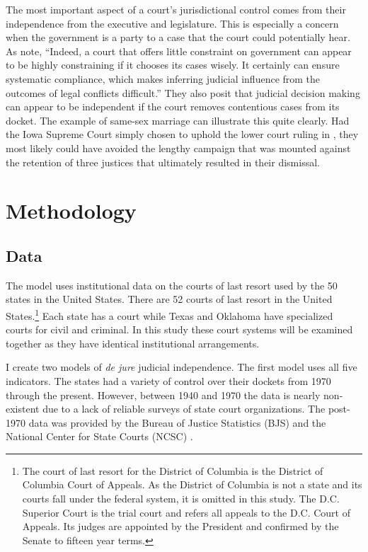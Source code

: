 \documentclass[12pt]{article}
\begin{document}
The most important aspect of a court's jurisdictional control comes from their independence from the executive and legislature.  This is especially a concern when the government is a party to a case that the court could potentially hear.  As \citet[6]{Rios2014} note, ``Indeed, a court that offers little constraint on government can appear to be highly constraining if it chooses its cases wisely. It certainly can ensure systematic compliance, which makes inferring judicial influence from the outcomes of legal conflicts difficult.''  They also posit that judicial decision making can appear to be independent if the court removes contentious cases from its docket.  The example of same-sex marriage can illustrate this quite clearly.  Had the Iowa Supreme Court simply chosen to uphold the lower court ruling in \cite{iowagay}, they most likely could have avoided the lengthy campaign that was mounted against the retention of three justices that ultimately resulted in their dismissal.

\section{Methodology}\label{Methods}
\subsection*{Data}
The model uses institutional data on the courts of last resort used by the 50 states in the United States.  There are 52 courts of last resort in the United States.\footnote{The court of last resort for the District of Columbia is the District of Columbia Court of Appeals.  As the District of Columbia is not a state and its courts fall under the federal system, it is omitted in this study.  The D.C. Superior Court is the trial court and refers all appeals to the D.C. Court of Appeals.  Its judges are appointed by the President and confirmed by the Senate to fifteen year terms.}  Each state has a court while Texas and Oklahoma have specialized courts for civil and criminal.  In this study these court systems will be examined together as they have identical institutional arrangements.  

I create two models of \textit{de jure} judicial independence.  The first model uses all five indicators.  The states had a variety of control over their dockets from 1970 through the present.  However, between 1940 and 1970 the data is nearly non-existent due to a lack of reliable surveys of state court organizations.  The post-1970 data was provided by the Bureau of Justice Statistics (BJS) and the National Center for State Courts (NCSC) \citep{BJS1993,BJS1998,BJS2004}.  
\end{document}
